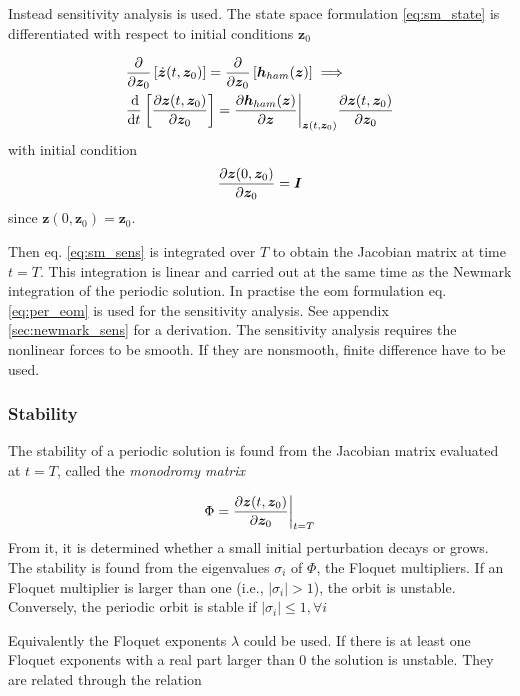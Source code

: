 Instead sensitivity analysis is used. The state space formulation
\eqref{eq:sm_state} is differentiated with respect to initial conditions $\bm
z_0$

\begin{align}
  &\frac{\partial}{\partial \bm z_0} \left[ \dot{\bm z}(t, \bm z_0) \right] =
    \frac{\partial}{\partial \bm z_0} \left[ \bm h_{ham}(\bm z) \right] \implies
  \nonumber \\
  &\frac{\operatorname{d}\!}{\operatorname{d}\! t} \left[  \frac{\partial \bm z(t, \bm z_0)}{\partial \bm z_0} \right] =
    \frac{\partial \bm h_{ham}(\bm z)}{\partial \bm z}\bigg|_{\bm z(t,\bm z_0)}
    \frac{\partial \bm z(t, \bm z_0)}{\partial \bm z_0}
    \label{eq:sm_sens}
\end{align}
with initial condition
\begin{equation}
  \label{eq:sm_sens_init}
  \frac{\partial \bm z(0,\bm z_0)}{\partial \bm z_0} = \bm I
\end{equation}
since $\bm z(0,\bm z_0) = \bm z_0$.

Then eq. \eqref{eq:sm_sens} is integrated over $T$ to obtain the Jacobian matrix
at time $t=T$. This integration is linear and carried out at the same time as
the Newmark integration of the periodic solution. In practise the eom
formulation eq. \eqref{eq:per_eom} is used for the sensitivity analysis. See
appendix \ref{sec:newmark_sens} for a derivation. The sensitivity analysis
requires the nonlinear forces to be smooth. If they are nonsmooth, finite
difference have to be used.

\subsubsection{Stability}
\label{sec:sm_stab}

The stability of a periodic solution is found from the Jacobian matrix evaluated
at $t=T$, called the \textit{monodromy matrix}

\begin{equation}
  \label{eq:sm_stab}
  \Phi = \frac{\partial \bm z(t, \bm z_0)}{\partial \bm z_0}\bigg|_{t=T}
\end{equation}
From it, it is determined whether a small initial perturbation decays or grows.
The stability is found from the eigenvalues $\sigma_i$ of $\Phi$, the Floquet
multipliers. If an Floquet multiplier is larger than one (i.e., $|\sigma_i|>
1$), the orbit is unstable. Conversely, the periodic orbit is stable if
$|\sigma_i| \leq 1, \forall i$

Equivalently the Floquet exponents $\lambda$ could be used. If there is at least
one Floquet exponents with a real part larger than 0 the solution is unstable.
They are related through the relation

